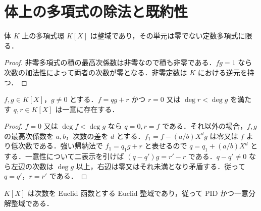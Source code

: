 \section{体上の多項式の除法と既約性}
\begin{prop}[体上の多項式環の単元]
体 $K$ 上の多項式環 $K[X]$ は整域であり，その単元は零でない定数多項式に限る．
\end{prop}
\begin{proof}
非零多項式の積の最高次係数は非零なので積も非零である．$fg=1$ なら次数の加法性によって両者の次数が零となる．非零定数は $K$ における逆元を持つ．
\end{proof}
\begin{prop}[多項式の除法算法]
$f,g\in K[X]$，$g\ne0$ とする．$f=qg+r$ かつ $r=0$ 又は $\deg r<\deg g$ を満たす $q,r\in K[X]$ は一意に存在する．
\end{prop}
\begin{proof}
$f=0$ 又は $\deg f<\deg g$ なら $q=0,r=f$ である．それ以外の場合，$f,g$ の最高次係数を $a,b$，次数の差を $d$ とする．$f_1=f-(a/b)X^d g$ は零又は $f$ より低次数である．強い帰納法で $f_1=q_1g+r$ と表せるので $q=q_1+(a/b)X^d$ とする．一意性について二表示を引けば $(q-q')g=r'-r$ である．$q-q'\ne0$ なら左辺の次数は $\deg g$ 以上，右辺は零又はそれ未満となり矛盾する．従って $q=q'$，$r=r'$ である．
\end{proof}
\begin{prop}[多項式環のEuclid性]
$K[X]$ は次数を Euclid 函数とする Euclid 整域であり，従って PID かつ一意分解整域である．
\end{prop}
